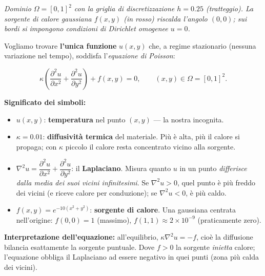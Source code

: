 \documentclass[a4paper,11pt]{article}
\theoremstyle{definition}
\begin{document}
\begin{center}

\smallskip
{\footnotesize\itshape
  Dominio $\Omega=[0,1]^2$ con la griglia di discretizzazione $h=0.25$ (tratteggio). 
  La sorgente di calore gaussiana $f(x,y)$ (in rosso) riscalda l'angolo $(0,0)$;
  sui bordi si impongono condizioni di Dirichlet omogenee $u = 0$.
}
\end{center}

Vogliamo trovare \textbf{l'unica funzione} $u(x,y)$ che, a regime stazionario (nessuna
variazione nel tempo), soddisfa l'\emph{equazione di Poisson}:

\begin{equation}
  \kappa \left(\frac{\partial^2 u}{\partial x^2} + \frac{\partial^2 u}{\partial y^2}\right) + f(x,y) = 0,
  \qquad (x,y) \in \Omega = [0,1]^2.
  \label{eq:calore}
\end{equation}

\begin{tcolorbox}[concetto]
\textbf{Significato dei simboli:}
\begin{itemize}
  \item $u(x,y)$: \textbf{temperatura} nel punto $(x,y)$ — la nostra incognita.
  \item $\kappa = 0.01$: \textbf{diffusività termica} del materiale. Più è alta, più il
        calore si propaga; con $\kappa$ piccolo il calore resta concentrato vicino alla sorgente.
  \item $\nabla^2 u = \dfrac{\partial^2 u}{\partial x^2} + \dfrac{\partial^2 u}{\partial y^2}$:
        il \textbf{Laplaciano}. Misura quanto $u$ in un punto \emph{differisce dalla media dei
        suoi vicini infinitesimi}. Se $\nabla^2 u > 0$, quel punto è più freddo dei vicini (e
        riceve calore per conduzione); se $\nabla^2 u < 0$, è più caldo.
  \item $f(x,y) = e^{-10(x^2+y^2)}$: \textbf{sorgente di calore}. Una gaussiana centrata
        nell'origine: $f(0,0)=1$ (massimo), $f(1,1)\approx 2\times10^{-9}$ (praticamente zero).
\end{itemize}
\textbf{Interpretazione dell'equazione:}
all'equilibrio, $\kappa\nabla^2 u = -f$, cioè la diffusione bilancia esattamente la
sorgente puntuale. Dove $f>0$ la sorgente \emph{inietta} calore; l'equazione obbliga
il Laplaciano ad essere negativo in quei punti (zona più calda dei vicini).
\end{tcolorbox}
\end{document}
